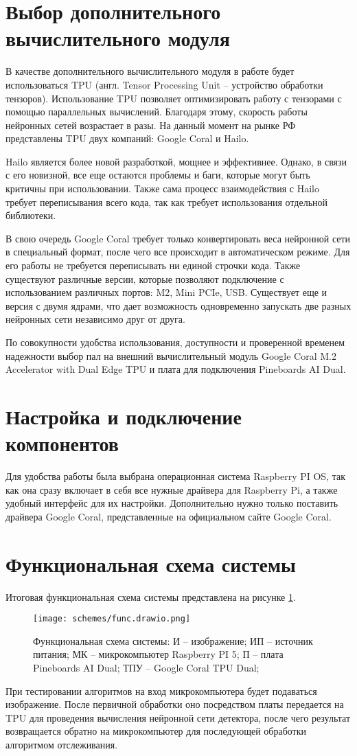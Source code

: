 \section{Выбор дополнительного вычислительного модуля}
В качестве дополнительного вычислительного модуля в работе будет использоваться TPU (англ. Tensor Processing Unit -- устройство обработки тензоров). Использование TPU позволяет оптимизировать работу с тензорами с помощью параллельных вычислений.
Благодаря этому, скорость работы нейронных сетей возрастает в разы. На данный момент на рынке РФ представлены TPU двух компаний: Google Coral и Hailo. 

Hailo является более новой разработкой, мощнее и эффективнее. Однако, в связи с его новизной, все еще остаются проблемы и баги, которые могут быть критичны при использовании. Также сама процесс взаимодействия с Hailo требует переписывания всего кода, так как требует использования отдельной библиотеки. 

В свою очередь Google Coral требует только конвертировать веса нейронной сети в специальный формат, после чего все происходит в автоматическом режиме. Для его работы не требуется переписывать ни единой строчки кода. 
Также существуют различные версии, которые позволяют подключение с использованием различных портов: M2, Mini PCIe, USB. 
Существует еще и версия с двумя ядрами, что дает возможность одновременно запускать две разных нейронных сети независимо друг от друга. 

По совокупности удобства использования, доступности и проверенной временем надежности выбор пал на внешний вычислительный модуль Google Coral M.2 Accelerator with Dual Edge TPU и плата для подключения Pineboards AI Dual. 

\section{Настройка и подключение компонентов}
Для удобства работы была выбрана операционная система Raspberry PI OS, так как она сразу включает в себя все нужные драйвера для Raspberry Pi, а также удобный интерфейс для их настройки. 
Дополнительно нужно только поставить драйвера Google Coral, представленные на официальном сайте Google Coral. 

\section{Функциональная схема системы}

Итоговая функциональная схема системы представлена на рисунке \ref{fig:func_scheme}. 
\begin{figure}[ht]
  \centering
  \texttt{[image: schemes/func.drawio.png]}
  \caption{Функциональная схема системы: И -- изображение; ИП -- источник питания; МК -- микрокомпьютер Raspberry PI 5; П -- плата Pineboards AI Dual; ТПУ -- Google Coral TPU Dual;}
  \label{fig:func_scheme}
\end{figure}
При тестировании алгоритмов на вход микрокомпьютера будет подаваться изображение. После первичной обработки оно посредством платы передается на TPU для проведения вычисления нейронной сети детектора, после чего результат возвращается обратно на микрокомпьютер для последующей обработки алгоритмом отслеживания.

